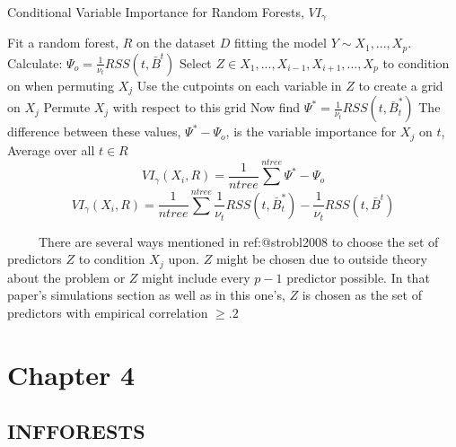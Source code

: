 \documentclass[12pt,twoside]{reedthesis}
\begin{document}
  \begin{algorithm}
  \caption{Conditional Variable Importance for Random Forests, $VI_{\gamma}$}
  \label{strobl}
  \begin{algorithmic}[1]
  \State Fit a random forest, $R$ on the dataset $D$ fitting the model $Y \sim X_1,...,X_p$.
  \State Calculate: $\Psi_o =  \frac 1 {\nu_t} RSS(t,\bar{B}^t)$
  \State Select $Z \in X_1,...,X_{i-1}, X_{i+1},...,X_p$ to condition on when permuting $X_j$
  \State Use the cutpoints on each variable in $Z$ to create a grid on $X_j$
  \State Permute $X_j$ with respect to this grid
  \State Now find $\Psi^* =  \frac 1 {\nu_t} RSS(t,\bar{B}_t^*)$
  \State The difference between these values, $\Psi^* - \Psi_o$,  is the variable importance for $X_j$ on $t$,  
  \EndFor
  \State Average over all $t \in R$ 
   $$VI_{\gamma}(X_i,R) = \frac 1 {ntree} \sum^{ntree} \Psi^* - \Psi_o$$
   $$VI_{\gamma}(X_i, R) = \frac 1 {ntree} \sum^{ntree} \frac 1 {\nu_t} RSS(t,\bar{B}_t^*) - \frac 1 {\nu_t} RSS(t,\bar{B}^t)$$
  \EndFor
  \end{algorithmic}
  \end{algorithm}
  
  ~~~~~There are several ways mentioned in ref:@strobl2008 to choose the
  set of predictors \(Z\) to condition \(X_j\) upon. \(Z\) might be chosen
  due to outside theory about the problem or \(Z\) might include every
  \(p-1\) predictor possible. In that paper's simulations section as well
  as in this one's, \(Z\) is chosen as the set of predictors with
  empirical correlation \(\geq .2\)
  
  \chapter{Chapter 4}\label{chapter-4}
  
  \section{INFFORESTS}\label{infforests}
  
\end{document}
